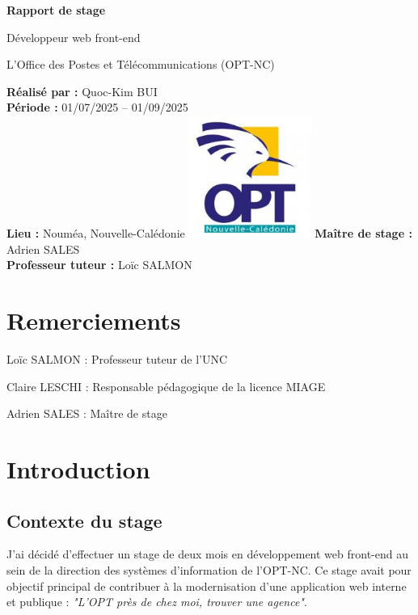 \documentclass[12pt,a4paper]{report}
\begin{document}
\begin{titlepage}
\centering
{\Huge\bfseries Rapport de stage \par}
\vspace{1cm}
{\Large Développeur web front-end \par}
\vspace{1cm}
{\Large L’Office des Postes et Télécommunications (OPT-NC) \par}
\vfill
\textbf{Réalisé par :} Quoc-Kim BUI \\
\textbf{Période :} 01/07/2025 – 01/09/2025 \\
\textbf{Lieu :} Nouméa, Nouvelle-Calédonie
\vfill
\includegraphics[width=0.3\textwidth]{ressources_rapport/logo_opt.jpg}
\vfill
\textbf{Maître de stage :} Adrien SALES \\
\textbf{Professeur tuteur :} Loïc SALMON
\end{titlepage}

\chapter*{Remerciements}
Loïc SALMON : Professeur tuteur de l'UNC

\vspace{1cm}
Claire LESCHI : Responsable pédagogique de la licence MIAGE

\vspace{1cm}
Adrien SALES : Maître de stage

\newpage

\tableofcontents
\newpage

\chapter{Introduction}
\section{Contexte du stage}
J'ai décidé d'effectuer un stage de deux mois en développement web front-end au sein de la direction des systèmes d’information de l’OPT-NC. Ce stage avait pour objectif principal de contribuer à la modernisation d’une application web interne et publique : \textit{"L'OPT près de chez moi, trouver une agence"}.
\end{document}

